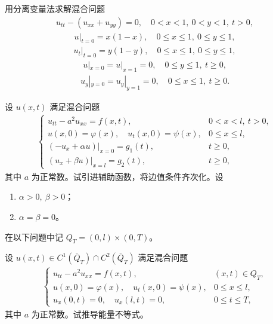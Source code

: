 \documentclass[../../main.tex]{subfiles}%
\begin{document}
\begin{example}
用分离变量法求解混合问题
\begin{align*}
u_{tt}-(u_{xx}+u_{yy})=0,\quad 0<x<1,\ 0<y<1,\ t>0,
\end{align*}
\begin{align*}
u|_{t=0}=x(1-x),\quad 0\leqslant x\leqslant 1,\ 0\leqslant y\leqslant 1,
\end{align*}
\begin{align*}
u_t|_{t=0}=y(1-y),\quad 0\leqslant x\leqslant 1,\ 0\leqslant y\leqslant 1,
\end{align*}
\begin{align*}
u|_{x=0}=u|_{x=1}=0,\quad 0\leqslant y\leqslant 1,\ t\geqslant 0,
\end{align*}
\begin{align*}
u_y|_{y=0}=u_y|_{y=1}=0,\quad 0\leqslant x\leqslant 1,\ t\geqslant 0.
\end{align*}
\end{example}

\begin{example}
设 $u(x,t)$ 满足混合问题
\begin{align*}
\begin{cases}
u_{tt}-a^2u_{xx}=f(x,t), & 0<x<l,\ t>0, \\
u(x,0)=\varphi(x),\quad u_t(x,0)=\psi(x), & 0\leqslant x\leqslant l, \\
(-u_x+\alpha u)|_{x=0}=g_1(t), & t\geqslant 0, \\
(u_x+\beta u)|_{x=l}=g_2(t), & t\geqslant 0,
\end{cases}
\end{align*}
其中 $a$ 为正常数。试引进辅助函数，将边值条件齐次化。设
\begin{enumerate}[(1)]
\item $\alpha>0,\ \beta>0$；
\item $\alpha=\beta=0$。
\end{enumerate}
\end{example}

在以下问题中记 $Q_T=(0,l)\times(0,T)$。

\begin{example}
设 $u(x,t)\in C^1(\overline{Q}_T)\cap C^2(\overline{Q}_T)$ 满足混合问题
\begin{align*}
\begin{cases}
u_{tt}-a^2u_{xx}=f(x,t), & (x,t)\in Q_T, \\
u(x,0)=\varphi(x),\quad u_t(x,0)=\psi(x), & 0\leqslant x\leqslant l, \\
u_x(0,t)=0,\quad u_x(l,t)=0, & 0\leqslant t\leqslant T,
\end{cases}
\end{align*}
其中 $a$ 为正常数。试推导能量不等式。
\end{example}
\end{document}
